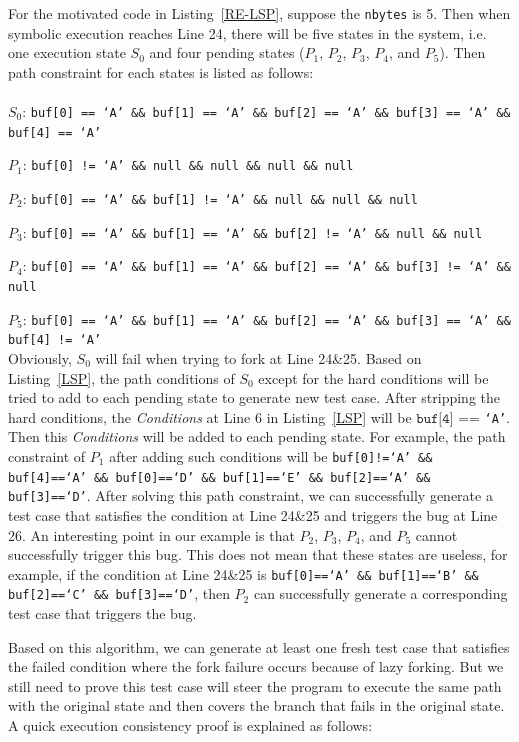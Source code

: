 For the motivated code in Listing~\ref{RE-LSP}, suppose the \texttt{nbytes} is 5. Then when symbolic execution reaches Line 24, there will be five states in the system, i.e. one execution state $S_0$ and four pending states ($P_1$, $P_2$, $P_3$, $P_4$, and $P_5$). 
Then path constraint for each states is listed as follows:
\\
\\
\indent$S_0$: \texttt{buf[0] == `A' \&\& buf[1] == `A' \&\& buf[2] == `A' \&\& buf[3] == `A' \&\& buf[4] == `A'}

$P_1$: \texttt{buf[0] != `A' \&\& null \&\& null  \&\& null  \&\& null}

$P_2$: \texttt{buf[0] == `A' \&\& buf[1] != `A' \&\& null \&\& null  \&\& null}

$P_3$: \texttt{buf[0] == `A' \&\& buf[1] == `A' \&\& buf[2] != `A' \&\& null  \&\& null}

$P_4$: \texttt{buf[0] == `A' \&\& buf[1] == `A' \&\& buf[2] == `A' \&\& buf[3] != `A'  \&\& null}

$P_5$: \texttt{buf[0] == `A' \&\& buf[1] == `A' \&\& buf[2] == `A' \&\& buf[3] == `A'  \&\& buf[4] != `A'}
\\

Obviously, $S_0$ will fail when trying to fork at Line 24\&25. Based on Listing~\ref{LSP}, the path conditions of $S_0$ except for the hard conditions will be tried to add to each pending state to generate new test case. After stripping the hard conditions, the \textit{Conditions} at Line 6 in Listing~\ref{LSP} will be $\texttt{buf[4]}$ == \texttt{`A'}. Then this \textit{Conditions} will be added to each pending state. For example, the path constraint of $P_1$ after adding such conditions will be \texttt{buf[0]!=`A' \&\& buf[4]==`A' \&\& buf[0]==`D' \&\& buf[1]==`E' \&\& buf[2]==`A' \&\& buf[3]==`D'}. After solving this path constraint, we can successfully generate a test case that satisfies the condition at Line 24\&25 and triggers the bug at Line 26. 
An interesting point in our example is that $P_2$, $P_3$, $P_4$, and $P_5$ cannot successfully trigger this bug. This does not mean that these states are useless, for example, if the condition at Line 24\&25 is \texttt{buf[0]==`A' \&\& buf[1]==`B' \&\& buf[2]==`C' \&\& buf[3]==`D'}, then $P_2$ can successfully generate a corresponding test case that triggers the bug.
 

Based on this algorithm, we can generate at least one fresh test case that satisfies the failed condition where the fork failure occurs because of lazy forking. But we still need to prove this test case will steer the program to execute the same path with the original state and then covers the branch that fails in the original state. A quick execution consistency proof is explained as follows:

